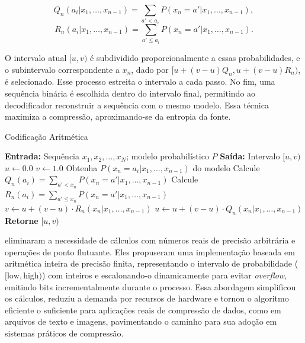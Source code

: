 \begin{equation}
Q_n(a_i | x_1, \ldots, x_{n-1}) = \sum_{a' < a_i} P(x_n = a' | x_1, \ldots, x_{n-1}),
\end{equation}
\begin{equation}
R_n(a_i | x_1, \ldots, x_{n-1}) = \sum_{a' \leq a_i} P(x_n = a' | x_1, \ldots, x_{n-1}).
\end{equation}

O intervalo atual $[u, v)$ é subdividido proporcionalmente a essas
probabilidades, e o subintervalo correspondente a $x_n$, dado por 
$[u + (v-u)Q_n, u + (v-u)R_n)$, é selecionado.
Esse processo estreita o
intervalo a cada passo. No fim, uma sequência binária é escolhida dentro do
intervalo final, permitindo ao decodificador reconstruir a sequência com o
mesmo modelo. Essa técnica maximiza a compressão, aproximando-se da entropia da
fonte.


%
\begin{algorithm}
\caption{Codificação Aritmética}
\label{alg:arithmetic_coding}
\begin{algorithmic}[1]
\State \textbf{Entrada:} Sequência \( x_1, x_2, \dots, x_N \); modelo probabilístico \( P \)
\State \textbf{Saída:} Intervalo \( [u, v) \)
\State \( u \gets 0.0 \)
\State \( v \gets 1.0 \)
    \State Obtenha \( P(x_n = a_i | x_1, \dots, x_{n-1}) \) do modelo
    \State Calcule \( Q_n(a_i) = \sum_{a' < x_n} P(x_n = a' | x_1, \dots, x_{n-1}) \)
    \State Calcule \( R_n(a_i) = \sum_{a' \leq x_n} P(x_n = a' | x_1, \dots, x_{n-1}) \)
    \State \( v \gets u + (v - u) \cdot R_n(x_n | x_1, \dots, x_{n-1}) \)
    \State \( u \gets u + (v - u) \cdot Q_n(x_n | x_1, \dots, x_{n-1}) \)
\EndFor
\State \textbf{Retorne} \( [u, v) \)
\end{algorithmic}
\end{algorithm}


\textcite{Witten1987} eliminaram a necessidade de cálculos com números reais de
precisão arbitrária e operações de ponto flutuante. Eles propuseram uma
implementação baseada em aritmética inteira de precisão finita, representando o
intervalo de probabilidade ($[\text{low}, \text{high})$) com inteiros e
escalonando-o dinamicamente para evitar \emph{overflow}, emitindo bits
incrementalmente durante o processo. Essa abordagem simplificou os cálculos,
reduziu a demanda por recursos de hardware e tornou o algoritmo eficiente o
suficiente para aplicações reais de compressão de dados, como em arquivos de
texto e imagens, pavimentando o caminho para sua adoção em sistemas práticos de
compressão.








